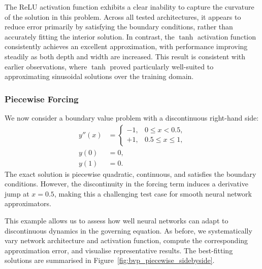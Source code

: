 The ReLU activation function exhibits a clear inability to capture the curvature of the solution 
in this problem. Across all tested architectures, it appears to reduce error primarily by satisfying
the boundary conditions, rather than accurately fitting the interior solution. In contrast, 
the $\tanh$ activation function consistently achieves an excellent approximation, with 
performance improving steadily as both depth and width are increased. This result is 
consistent with earlier observations, where $\tanh$ proved particularly well-suited to 
approximating sinusoidal solutions over the training domain.

\subsubsection{Piecewise Forcing}

We now consider a boundary value problem with a discontinuous right-hand side:
\[
\begin{aligned}
    y''(x) &= 
    \begin{cases}
        -1, & 0 \leq x < 0.5, \\
        +1, & 0.5 \leq x \leq 1,
    \end{cases} \\
    y(0) &= 0, \\
    y(1) &= 0.
\end{aligned}
\]
The exact solution is piecewise quadratic, continuous, and satisfies the boundary conditions. 
However, the discontinuity in the forcing term induces a derivative jump at \( x = 0.5 \), 
making this a challenging test case for smooth neural network approximators.

This example allows us to assess how well neural networks can adapt to discontinuous dynamics
in the governing equation. As before, we systematically vary network architecture and activation 
function, compute the corresponding approximation error, and visualise representative results.
The best-fitting solutions are summarised in Figure~\ref{fig:bvp_piecewise_sidebyside}.

